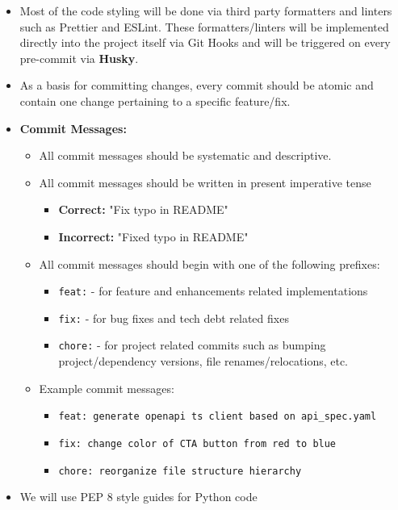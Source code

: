 \documentclass{article}
\begin{document}
\begin{itemize}
    \item Most of the code styling will be done via third party formatters and
    linters such as Prettier and ESLint. These formatters/linters will be
    implemented directly into the project itself via Git Hooks and will be
    triggered on every pre-commit via \textbf{Husky}.
    \item As a basis for committing changes, every commit should be atomic and
    contain one change pertaining to a specific feature/fix.
    \item \textbf{Commit Messages:}
    \begin{itemize}
        \item All commit messages should be systematic and descriptive.
        \item All commit messages should be written in present imperative tense
        \begin{itemize}
            \item \textbf{Correct:} "Fix typo in README"
            \item \textbf{Incorrect:} "Fixed typo in README"
        \end{itemize}
        \item All commit messages should begin with one of the following
        prefixes:
        \begin{itemize}
            \item \texttt{feat:} - for feature and enhancements related
            implementations
            \item \texttt{fix:} - for bug fixes and tech debt related fixes
            \item \texttt{chore:} - for project related commits such as bumping
            project/dependency versions, file renames/relocations, etc.
        \end{itemize}
        \item Example commit messages:
        \begin{itemize}
            \item \texttt{feat: generate openapi ts client based on
            api\_spec.yaml}
            \item \texttt{fix: change color of CTA button from red to blue}
            \item \texttt{chore: reorganize file structure hierarchy}
        \end{itemize}
    \end{itemize}
    \item We will use PEP 8 style guides for Python code
\end{itemize}
\end{document}
